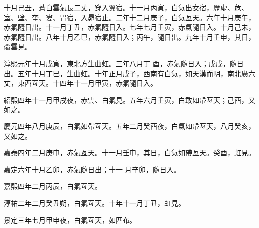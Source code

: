 \begin{pinyinscope}
 十月己丑，蒼白雲氣長二丈，穿入翼宿。十一月丙寅，白氣出女宿，歷虛、危、室、壁、奎、婁、胃宿，入昴宿止。二年十二月庚子，白氣亙天。六年十月庚午，赤氣隨日出。十一月丁丑，赤氣隨日入。七年七月壬寅，赤氣隨日入。十月己未，赤氣隨日出。八年十月乙巳，赤氣隨日入；丙午，隨日出。九年十月壬申，其日，矞雲見。



 淳熙元年十月戊寅，東北方生曲虹。三年八月丁
 酉，赤氣隨日入；戊戌，隨日出。五年十月丁巳，生曲虹。十年正月戊子，西南有白氣，如天漢而明，南北廣六丈，東西亙天。十四年十一月甲寅，赤氣隨日入。



 紹熙四年十一月甲戌夜，赤雲、白氣見。五年六月壬寅，白敢如帶亙天；己酉，又如之。



 慶元四年八月庚辰，白氣如帶亙天。五年二月癸酉夜，白氣如帶亙天，八月癸亥，又如之。



 嘉泰四年二月庚申，赤氣亙天。十一月壬申，其日，白氣如帶亙天。癸酉，虹見。



 嘉定六年十月乙卯，赤氣隨日出；十一
 月辛卯，隨日入。



 嘉熙四年二月丙辰，白氣亙天。



 淳祐二年二月癸丑朔，白氣亙天。十年十一月丁丑，虹見。



 景定三年七月甲申夜，白氣亙天，如匹布。



\end{pinyinscope}